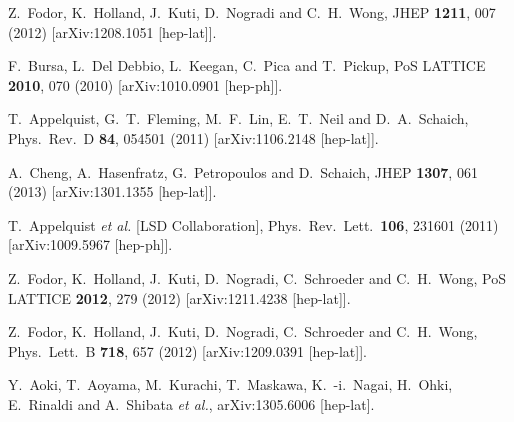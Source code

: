 \begin{thebibliography}{99}
  Z.~Fodor, K.~Holland, J.~Kuti, D.~Nogradi and C.~H.~Wong,
  JHEP {\bf 1211}, 007 (2012)
  [arXiv:1208.1051 [hep-lat]].

  F.~Bursa, L.~Del Debbio, L.~Keegan, C.~Pica and T.~Pickup,
  PoS LATTICE {\bf 2010}, 070 (2010)
  [arXiv:1010.0901 [hep-ph]].

  T.~Appelquist, G.~T.~Fleming, M.~F.~Lin, E.~T.~Neil and D.~A.~Schaich,
  Phys.\ Rev.\ D {\bf 84}, 054501 (2011)
  [arXiv:1106.2148 [hep-lat]].

  A.~Cheng, A.~Hasenfratz, G.~Petropoulos and D.~Schaich,
  JHEP {\bf 1307}, 061 (2013)
  [arXiv:1301.1355 [hep-lat]].

  T.~Appelquist {\it et al.}  [LSD Collaboration],
  Phys.\ Rev.\ Lett.\  {\bf 106}, 231601 (2011)
  [arXiv:1009.5967 [hep-ph]].
  
  Z.~Fodor, K.~Holland, J.~Kuti, D.~Nogradi, C.~Schroeder and C.~H.~Wong,
  PoS LATTICE {\bf 2012}, 279 (2012)
  [arXiv:1211.4238 [hep-lat]].
  
  Z.~Fodor, K.~Holland, J.~Kuti, D.~Nogradi, C.~Schroeder and C.~H.~Wong,
  Phys.\ Lett.\ B {\bf 718}, 657 (2012)
  [arXiv:1209.0391 [hep-lat]].
  
  Y.~Aoki, T.~Aoyama, M.~Kurachi, T.~Maskawa, K.~-i.~Nagai, H.~Ohki, E.~Rinaldi and A.~Shibata {\it et al.},
  arXiv:1305.6006 [hep-lat].
  

\end{thebibliography}
